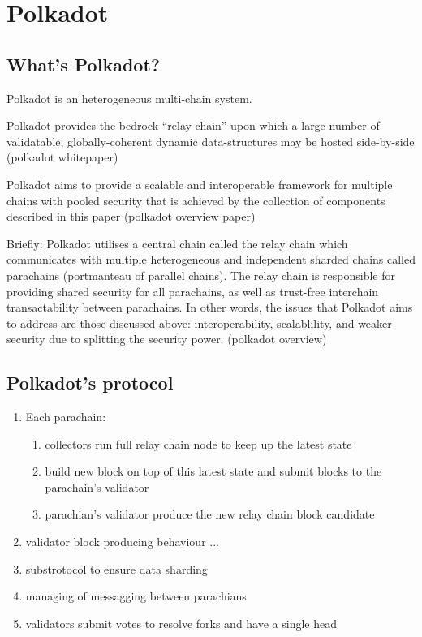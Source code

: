 \documentclass[../main.tex]{subfiles}
\begin{document}
\section{Polkadot}
\subsection{What's Polkadot?}
Polkadot is an heterogeneous multi-chain system.

Polkadot provides the bedrock “relay-chain” upon which a large number of validatable, globally-coherent dynamic data-structures may be hosted side-by-side (polkadot whitepaper)

Polkadot aims to provide a scalable and interoperable framework for multiple chains with pooled security that is achieved by the collection of components described in this paper (polkadot overview paper)

Briefly: Polkadot utilises a central chain called the relay chain which communicates with multiple heterogeneous and independent sharded chains called parachains (portmanteau of parallel chains). The relay chain is responsible for providing shared security for all parachains, as well as trust-free interchain transactability between parachains. In other words, the issues that Polkadot aims to address are those discussed above: interoperability, scalablility, and weaker security due to splitting the security power. (polkadot overview)

\subsection{Polkadot's protocol}

\begin{enumerate}
  \item Each parachain:
        \begin{enumerate}
                \item collectors run full relay chain node to keep up the latest state
                \item build new block on top of this latest state and submit blocks to the parachain's validator
                \item parachian's validator produce the new relay chain block candidate
        \end{enumerate}
    \item validator block producing behaviour ...
    \item substrotocol to ensure data sharding
    \item managing of messagging between parachians
    \item validators submit votes to resolve forks and have a single head
\end{enumerate}
\end{document}
